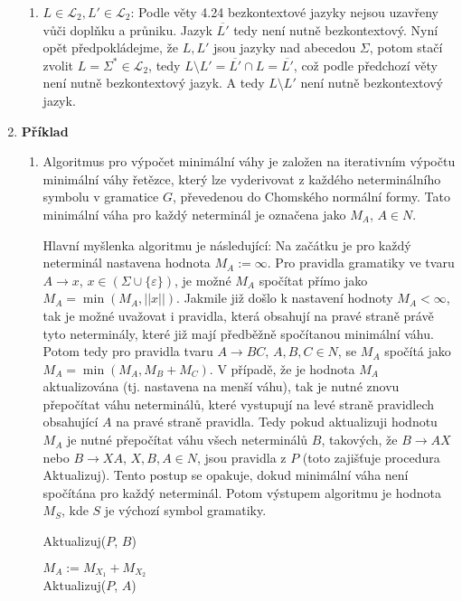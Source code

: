 \documentclass[a4paper,12pt]{article}
\begin{document}
\begin{enumerate}[label=\textbf{\arabic*}.]
\begin{enumerate}
   \item $L \in\mathcal{L}_2, L' \in\mathcal{L}_2$: Podle věty 4.24 bezkontextové jazyky nejsou uzavřeny vůči doplňku a průniku.
    Jazyk $\overline{L'}$ tedy není nutně bezkontextový. Nyní opět předpokládejme, že $L, L'$ jsou jazyky nad abecedou $\Sigma$, potom stačí zvolit $L = \Sigma^* \in\mathcal{L}_2$, 
    tedy $L\setminus L' = \overline{L'}\cap L = \overline{L'}$, což podle předchozí věty není nutně bezkontextový jazyk. A tedy 
    $L\setminus L'$ není nutně bezkontextový jazyk.
  \end{enumerate}

  \enlargethispage{1em}
 \item {\bfseries Příklad}
 \begin{enumerate}
  \item Algoritmus pro výpočet minimální váhy je založen na iterativním výpočtu minimální váhy řetězce, který lze vyderivovat 
  z každého neterminálního symbolu v gramatice $G$, převedenou do Chomského normální formy. Tato minimální váha pro každý neterminál je označena jako $M_A$, $A\in N$. 
  
  Hlavní myšlenka algoritmu je následující: Na začátku je pro každý neterminál nastavena hodnota $M_A := \infty$. Pro pravidla gramatiky ve tvaru $A\rightarrow x$, $x\in(\Sigma\cup\{\varepsilon\})$, je možné $M_A$ spočítat přímo jako $M_A = \min(M_A, ||x||)$.
  Jakmile již došlo k nastavení hodnoty $M_A < \infty$, tak je možné uvažovat i pravidla, která obsahují na pravé straně právě tyto neterminály, 
  které již mají předběžně spočítanou minimální váhu. Potom tedy pro pravidla tvaru $A \rightarrow BC$, $A, B, C \in N$, se $M_A$ spočítá jako $M_A = \min(M_A, M_B + M_C)$.
  V případě, že je hodnota $M_A$ aktualizována (tj. nastavena na menší váhu), tak je nutné znovu přepočítat váhu neterminálů, které vystupují 
  na levé straně pravidlech obsahující $A$ na pravé straně pravidla. Tedy pokud aktualizuji hodnotu $M_A$ je nutné přepočítat váhu všech neterminálů $B$, takových, že 
  $B\rightarrow AX$ nebo $B\rightarrow XA$, $X,B,A \in N$, jsou pravidla z $P$ (toto zajišťuje procedura Aktualizuj).
  Tento postup se opakuje, dokud minimální váha není spočítána pro každý neterminál. Potom výstupem algoritmu je hodnota $M_S$, kde $S$ je výchozí symbol gramatiky.
  
  \enlargethispage{1em}
   \begin{procedure}[H]
  \caption{Aktualizuj($P$, $B$)}
 \SetNlSty{}{}{:}
 \SetNlSkip{-1.0em}
 \SetInd{0.5em}{0.5em}
 \Indentp{1.4em}
    {
      {
	$M_A := M_{X_1} + M_{X_2} $ \\
	Aktualizuj($P$, $A$)
      }
    }
\end{procedure}
  

\end{enumerate}
\end{enumerate}
\end{document}
